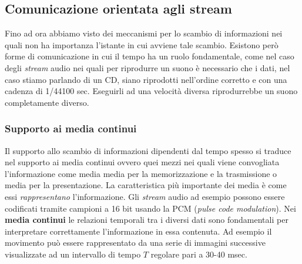 \subsection{Comunicazione orientata agli stream}
Fino ad ora abbiamo visto dei meccanismi per lo scambio di informazioni nei quali non ha importanza l'istante in cui avviene tale scambio. Esistono però forme di comunicazione in cui il tempo ha un ruolo fondamentale, come nel caso degli \emph{stream} audio nei quali per riprodurre un suono è necessario che i dati, nel caso stiamo parlando di un CD, siano riprodotti nell'ordine corretto e con una cadenza di 1/44100 sec. Eseguirli ad una velocità diversa riprodurrebbe un suono completamente diverso.
\subsubsection{Supporto ai media continui}
Il supporto allo scambio di informazioni dipendenti dal tempo spesso si traduce nel supporto ai media continui ovvero quei mezzi nei quali viene convogliata l'informazione come media media per la memorizzazione e la trasmissione o media per la presentazione. La caratteristica più importante dei media è come essi \emph{rappresentano} l'informazione. Gli \emph{stream} audio ad esempio possono essere codificati tramite campioni a 16 bit usando la PCM (\emph{pulse code modulation}). Nei \textbf{media continui} le relazioni temporali tra i diversi dati sono fondamentali per interpretare correttamente l'informazione in essa contenuta. Ad esempio il movimento può essere rappresentato da una serie di immagini successive visualizzate ad un intervallo di tempo $T$ regolare pari a 30-40 msec.

